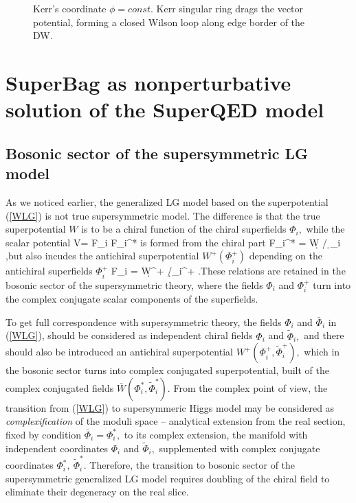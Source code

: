 \documentclass[aps,prd,twocolumn,showpacs]{revtex4}
\begin{document}
  \begin{figure}[ht]
\centerline{} \caption{\label{label} Kerr's
coordinate $\phi=const.$   Kerr singular ring drags the vector potential, forming a closed Wilson
loop along edge border of the DW.}
\end{figure}


\section{SuperBag as nonperturbative solution of the SuperQED model}

\subsection{Bosonic sector of the supersymmetric LG model}
As we noticed earlier, the generalized LG model based on the superpotential (\ref{WLG}) is not true
supersymmetric model. The difference is that the true superpotential $W$ is to be a
chiral function of the chiral superfields $\Phi_i ,$ while the scalar potential  \be V= F_i
F_i^* \ee is formed from the chiral part \be F_i^* = \d W / \d \Phi_i ,\ee but also incudes
the antichiral superpotential $W^+ (\Phi_i^+)$ depending on the antichiral superfields $\Phi_i^+ $
\be F_i = \d W^+ /\d \Phi_i^+ .\ee  These relations are retained in the bosonic sector of the
supersymmetric theory, where the fields $\Phi_i$ and $\Phi_i^+$ turn into the complex conjugate scalar
components of the superfields.

To get  full correspondence with supersymmetric theory, the fields $\Phi_i$ and $\bar \Phi_i $
in (\ref{WLG}), should be considered as independent chiral fields
$\Phi_i$ and $\tilde \Phi_i ,$ and there should also be introduced an
antichiral superpotential $W^+(\Phi_i^+, \tilde \Phi_i^+),$ which in the bosonic sector turns into
complex conjugated superpotential, built of the complex conjugated fields $\bar W(\Phi_i^*, \tilde
\Phi_i^*).$
From the complex point of view, the transition from (\ref{WLG}) to  supersymmeric
 Higgs model may be considered as \emph{complexification} of the moduli space -- analytical
extension from the real section, fixed by condition  $\bar \Phi_i = \Phi_i^* ,$ to its complex extension, the manifold with independent
coordinates $\Phi_i$ and $\tilde\Phi_i , $ supplemented with  complex conjugate coordinates  $\Phi_i^*, \ \tilde\Phi_i^* . $
Therefore, the transition to bosonic sector of the  supersymmetric generalized LG model
requires doubling of the chiral field to eliminate their degeneracy on the real slice.
\end{document}
